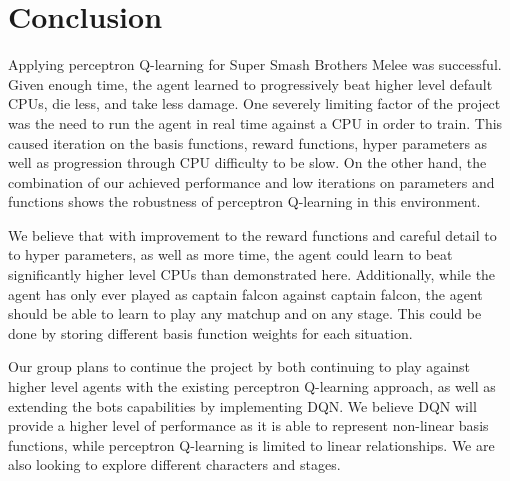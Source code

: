 \section{Conclusion}

Applying perceptron Q-learning for Super Smash Brothers Melee was successful. Given enough time, the agent learned to progressively beat higher level default CPUs, die less, and take less damage. One severely limiting factor of the project was the need to run the agent in real time against a CPU in order to train. This caused iteration on the basis functions, reward functions, hyper parameters as well as progression through CPU difficulty to be slow. On the other hand, the combination of our achieved performance and low iterations on parameters and functions shows the robustness of perceptron Q-learning in this environment. 

We believe that with improvement to the reward functions and careful detail to to hyper parameters, as well as more time, the agent could learn to beat significantly higher level CPUs than demonstrated here. Additionally, while the agent has only ever played as captain falcon against captain falcon, the agent should be able to learn to play any matchup and on any stage. This could be done by storing different basis function weights for each situation.

Our group plans to continue the project by both continuing to play against higher level agents with the existing perceptron Q-learning approach, as well as extending the bots capabilities by implementing DQN. We believe DQN will provide a higher level of performance as it is able to represent non-linear basis functions, while perceptron Q-learning is limited to linear relationships. We are also looking to explore different characters and stages.

